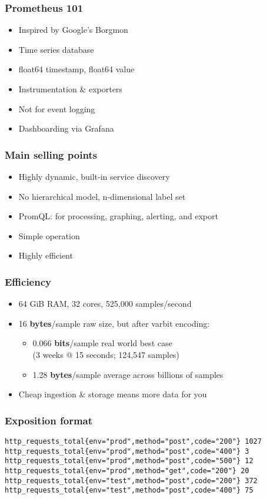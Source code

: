 \documentclass[t]{beamer}
\begin{document}
\begin{frame}
	\frametitle{Prometheus 101}
	\begin{itemize}
		\item Inspired by Google's Borgmon
		\item Time series database
		\item float64 timestamp, float64 value
		\item Instrumentation \& exporters
		\item Not for event logging
		\item Dashboarding via Grafana
	\end{itemize}
\end{frame}

\begin{frame}
	\frametitle{Main selling points}
	\begin{itemize}
		\item Highly dynamic, built-in service discovery
		\item No hierarchical model, n-dimensional label set
		\item PromQL: for processing, graphing, alerting, and export
		\item Simple operation
		\item Highly efficient
	\end{itemize}
\end{frame}

\begin{frame}
	\frametitle{Efficiency}
	\begin{itemize}
		\item 64 GiB RAM, 32 cores, 525,000 samples/second
		\item 16 \textbf{bytes}/sample raw size, but after varbit encoding:
		\begin{itemize}
			\item 0.066 \textbf{bits}/sample real world best case \\
				(3 weeks @ 15 seconds; 124,547 samples)
			\item 1.28 \textbf{bytes}/sample average across billions of samples
		\end{itemize}
		\item Cheap ingestion \& storage means more data for you
	\end{itemize}
\end{frame}

\begin{frame}[fragile]
	\frametitle{Exposition format}
	\fontsize{10pt}{12}\selectfont
	\begin{verbatim}
http_requests_total{env="prod",method="post",code="200"} 1027
http_requests_total{env="prod",method="post",code="400"} 3
http_requests_total{env="prod",method="post",code="500"} 12
http_requests_total{env="prod",method="get",code="200"} 20
http_requests_total{env="test",method="post",code="200"} 372
http_requests_total{env="test",method="post",code="400"} 75
	\end{verbatim}
\end{frame}
\end{document}
